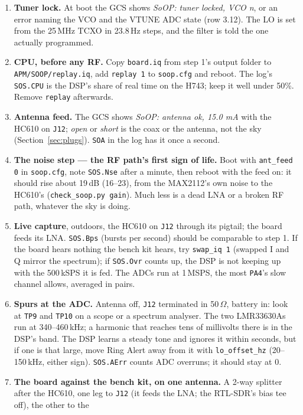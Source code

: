 \documentclass[11pt,a4paper]{article}
\newcommand{\file}[1]{\texttt{\small #1}}
\begin{document}
\begin{enumerate}
\item \textbf{Tuner lock.} At boot the GCS shows \emph{SoOP: tuner locked, VCO n}, or an
error naming the VCO and the VTUNE ADC state (row 3.12). The LO is set from the 25\,MHz TCXO
in 23.8\,Hz steps, and the filter is told the one actually programmed.
\item \textbf{CPU, before any RF.} Copy \file{board.iq} from step 1's output folder to
\file{APM/SOOP/replay.iq}, add \file{replay 1} to \file{soop.cfg} and reboot. The log's
\file{SOS.CPU} is the DSP's share of real time on the H743; keep it well under 50\%. Remove
\file{replay} afterwards.
\item \textbf{Antenna feed.} The GCS shows \emph{SoOP: antenna ok, 15.0 mA} with the HC610
on \file{J12}; \emph{open} or \emph{short} is the coax or the antenna, not the sky
(Section~\ref{sec:plugs}). \file{SOA} in the log has it once a second.
\item \textbf{The noise step --- the RF path's first sign of life.} Boot with \file{ant\_feed 0}
in \file{soop.cfg}, note \file{SOS.Nse} after a minute, then reboot with the feed on: it
should rise about 19\,dB (16--23), from the MAX2112's own noise to the HC610's
(\file{check\_soop.py gain}). Much less is a dead LNA or a broken RF path, whatever the sky
is doing.
\item \textbf{Live capture}, outdoors, the HC610 on \file{J12} through its pigtail; the board
feeds its LNA.
\file{SOS.Bps} (bursts per second) should be comparable to step 1. If the board hears nothing
the bench kit hears, try \file{swap\_iq 1} (swapped I and Q mirror the spectrum); if
\file{SOS.Ovr} counts up, the DSP is not keeping up with the 500\,kSPS it is fed. The
ADCs run at 1\,MSPS, the most \file{PA4}'s slow channel allows, averaged in pairs.
\item \textbf{Spurs at the ADC.} Antenna off, \file{J12} terminated in 50\,$\Omega$,
battery in: look at \file{TP9} and \file{TP10} on a scope or a spectrum analyser. The two
LMR33630As run at 340--460\,kHz; a harmonic that reaches tens of millivolts there is in the
DSP's band. The DSP learns a steady tone and ignores it within seconds, but if one is that
large, move Ring Alert away from it with \file{lo\_offset\_hz} (20--150\,kHz, either sign).
\file{SOS.AErr} counts ADC overruns; it should stay at 0.
\item \textbf{The board against the bench kit, on one antenna.} A 2-way splitter after the
HC610, one leg to \file{J12} (it feeds the LNA; the RTL-SDR's bias tee off), the other to the

\end{enumerate}
\end{document}
